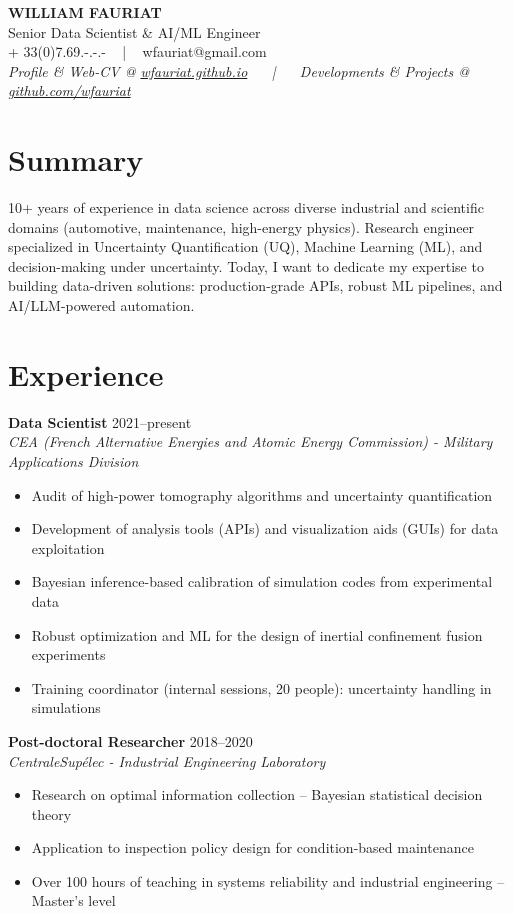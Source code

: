 \documentclass[10pt,a4paper]{article}
\newcommand{\resumeitem}[1]{\item\small{#1}}
\newcommand{\experience}[4]{
  \textbf{#1} \hfill \textcolor{mediumgray}{#2}\\
  \textit{\color{mediumgray}#3}%
  #4
  \vspace{1mm}
}
\begin{document}
\begin{center}
  {\LARGE\bfseries\color{accentcolor} WILLIAM FAURIAT}\\[1mm]
  {\large Senior Data Scientist \& AI/ML Engineer} 
  \\[1mm]
  \normalsize + 33(0)7.69.-.-.- ~ | ~ wfauriat@gmail.com \\[0.5mm] 
  \textit{
  Profile \& Web-CV @ \href{https://wfauriat.github.io}{wfauriat.github.io} ~~ | ~~
  Developments \& Projects @ \href{https://github.com/wfauriat}{github.com/wfauriat}}
\end{center}

\vspace{0.2mm}

\section*{Summary}
\small
10+ years of experience in data science across diverse industrial and scientific domains (automotive,
 maintenance, high-energy physics). Research engineer specialized in Uncertainty Quantification (UQ),
  Machine Learning (ML), and decision-making under uncertainty.
 Today, I want to dedicate my expertise to building data-driven solutions:
  production-grade APIs, robust ML pipelines, and AI/LLM-powered automation.
\section*{Experience}

\experience{Data Scientist}{2021--present}{CEA (French Alternative Energies and Atomic Energy Commission) - Military Applications Division}{
\begin{itemize}
  \resumeitem{Audit of high-power tomography algorithms and uncertainty quantification}
  \resumeitem{Development of analysis tools (APIs) and visualization aids (GUIs) for data exploitation}
  \resumeitem{Bayesian inference-based calibration of simulation codes from experimental data}
  \resumeitem{Robust optimization and ML for the design of inertial confinement fusion experiments}
  \resumeitem{Training coordinator (internal sessions, 20 people): uncertainty handling in simulations}
\end{itemize}
}

\experience{Post-doctoral Researcher}{2018--2020}{CentraleSupélec - Industrial Engineering Laboratory}{
\begin{itemize}
  \resumeitem{Research on optimal information collection -- Bayesian statistical decision theory}
  \resumeitem{Application to inspection policy design for condition-based maintenance}
  \resumeitem{Over 100 hours of teaching in systems reliability and industrial engineering -- Master's level}
\end{itemize}
}
\end{document}
